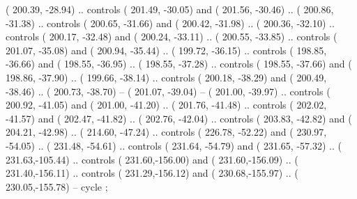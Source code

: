 {        ( 200.39, -28.94) .. controls ( 201.49, -30.05) and ( 201.56, -30.46) ..
        ( 200.86, -31.38) .. controls ( 200.65, -31.66) and ( 200.42, -31.98) ..
        ( 200.36, -32.10) .. controls ( 200.17, -32.48) and ( 200.24, -33.11) ..
        ( 200.55, -33.85) .. controls ( 201.07, -35.08) and ( 200.94, -35.44) ..
        ( 199.72, -36.15) .. controls ( 198.85, -36.66) and ( 198.55, -36.95) ..
        ( 198.55, -37.28) .. controls ( 198.55, -37.66) and ( 198.86, -37.90) ..
        ( 199.66, -38.14) .. controls ( 200.18, -38.29) and ( 200.49, -38.46) ..
        ( 200.73, -38.70) -- 
        ( 201.07, -39.04) -- 
        ( 201.00, -39.97) .. controls ( 200.92, -41.05) and ( 201.00, -41.20) ..
        ( 201.76, -41.48) .. controls ( 202.02, -41.57) and ( 202.47, -41.82) ..
        ( 202.76, -42.04) .. controls ( 203.83, -42.82) and ( 204.21, -42.98) ..
        ( 214.60, -47.24) .. controls ( 226.78, -52.22) and ( 230.97, -54.05) ..
        ( 231.48, -54.61) .. controls ( 231.64, -54.79) and ( 231.65, -57.32) ..
        ( 231.63,-105.44) .. controls ( 231.60,-156.00) and ( 231.60,-156.09) ..
        ( 231.40,-156.11) .. controls ( 231.29,-156.12) and ( 230.68,-155.97) ..
        ( 230.05,-155.78) -- 
        cycle ;
}

\newcommand{\fullmap}{%
  \fondterre

  \mermed
  \merrouge

  \lenil

  \lacfayoum
  \lacdelta
  \lactanis
  \lacpithom
  \lacavaris
  \lacalexandrie
  \lacsinai

  \begin{scope}[shift={(-19.38,-66.23)}]
    \frontold
  \end{scope}
  \begin{scope}[shift={(-155.28, 181.32)}]
    \frontnew
  \end{scope}

  \legendemasseseau

  \villes

  \regions
}

